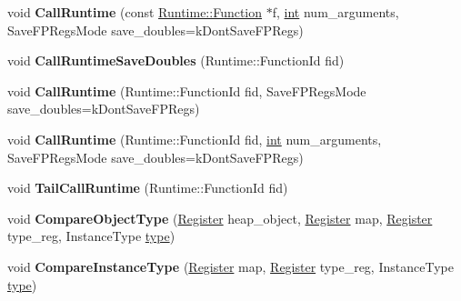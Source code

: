 \begin{DoxyCompactItemize}
void {\bfseries Call\+Runtime} (const \mbox{\hyperlink{structv8_1_1internal_1_1Runtime_1_1Function}{Runtime\+::\+Function}} $\ast$f, \mbox{\hyperlink{classint}{int}} num\+\_\+arguments, Save\+F\+P\+Regs\+Mode save\+\_\+doubles=k\+Dont\+Save\+F\+P\+Regs)
\item 
\mbox{\label{classv8_1_1internal_1_1MacroAssembler_aee12672409bb962021b154936d5f0e45}} 
void {\bfseries Call\+Runtime\+Save\+Doubles} (Runtime\+::\+Function\+Id fid)
\item 
\mbox{\label{classv8_1_1internal_1_1MacroAssembler_a797b53d578cd762b40c56f4485bf584e}} 
void {\bfseries Call\+Runtime} (Runtime\+::\+Function\+Id fid, Save\+F\+P\+Regs\+Mode save\+\_\+doubles=k\+Dont\+Save\+F\+P\+Regs)
\item 
\mbox{\label{classv8_1_1internal_1_1MacroAssembler_a87a8fd8a93b463d8485753c6d0d0465e}} 
void {\bfseries Call\+Runtime} (Runtime\+::\+Function\+Id fid, \mbox{\hyperlink{classint}{int}} num\+\_\+arguments, Save\+F\+P\+Regs\+Mode save\+\_\+doubles=k\+Dont\+Save\+F\+P\+Regs)
\item 
\mbox{\label{classv8_1_1internal_1_1MacroAssembler_aefb569829758555a7394ce1d34ed2bef}} 
void {\bfseries Tail\+Call\+Runtime} (Runtime\+::\+Function\+Id fid)
\item 
\mbox{\label{classv8_1_1internal_1_1MacroAssembler_a3c12ff43e4dc21fa5a9ddc0384641ed0}} 
void {\bfseries Compare\+Object\+Type} (\mbox{\hyperlink{classv8_1_1internal_1_1Register}{Register}} heap\+\_\+object, \mbox{\hyperlink{classv8_1_1internal_1_1Register}{Register}} map, \mbox{\hyperlink{classv8_1_1internal_1_1Register}{Register}} type\+\_\+reg, Instance\+Type \mbox{\hyperlink{classstd_1_1conditional_1_1type}{type}})
\item 
\mbox{\label{classv8_1_1internal_1_1MacroAssembler_a18c4f37a00c2903da694afa03f600688}} 
void {\bfseries Compare\+Instance\+Type} (\mbox{\hyperlink{classv8_1_1internal_1_1Register}{Register}} map, \mbox{\hyperlink{classv8_1_1internal_1_1Register}{Register}} type\+\_\+reg, Instance\+Type \mbox{\hyperlink{classstd_1_1conditional_1_1type}{type}})

\end{DoxyCompactItemize}
